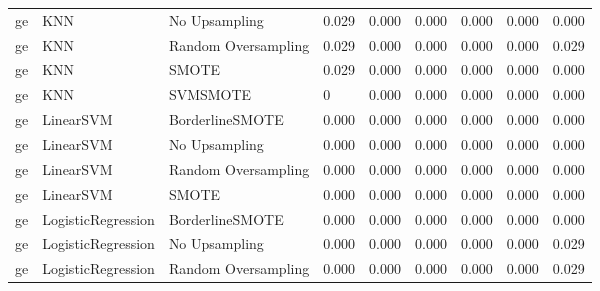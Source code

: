 \begin{tabular}{lllllllll}
      ge &                          KNN &       No Upsampling & 0.029 &                     0.000 &                 0.000 &                  0.000 &                                   0.000 &     0.000 \\
      ge &                          KNN & Random Oversampling & 0.029 &                     0.000 &                 0.000 &                  0.000 &                                   0.000 &     0.029 \\
      ge &                          KNN &               SMOTE & 0.029 &                     0.000 &                 0.000 &                  0.000 &                                   0.000 &     0.000 \\
      ge &                          KNN &            SVMSMOTE &     0 &                     0.000 &                 0.000 &                  0.000 &                                   0.000 &     0.000 \\
      ge &                    LinearSVM &     BorderlineSMOTE & 0.000 &                     0.000 &                 0.000 &                  0.000 &                                   0.000 &     0.000 \\
      ge &                    LinearSVM &       No Upsampling & 0.000 &                     0.000 &                 0.000 &                  0.000 &                                   0.000 &     0.000 \\
      ge &                    LinearSVM & Random Oversampling & 0.000 &                     0.000 &                 0.000 &                  0.000 &                                   0.000 &     0.000 \\
      ge &                    LinearSVM &               SMOTE & 0.000 &                     0.000 &                 0.000 &                  0.000 &                                   0.000 &     0.000 \\
      ge &           LogisticRegression &     BorderlineSMOTE & 0.000 &                     0.000 &                 0.000 &                  0.000 &                                   0.000 &     0.000 \\
      ge &           LogisticRegression &       No Upsampling & 0.000 &                     0.000 &                 0.000 &                  0.000 &                                   0.000 &     0.029 \\
      ge &           LogisticRegression & Random Oversampling & 0.000 &                     0.000 &                 0.000 &                  0.000 &                                   0.000 &     0.029 \\

\end{tabular}
